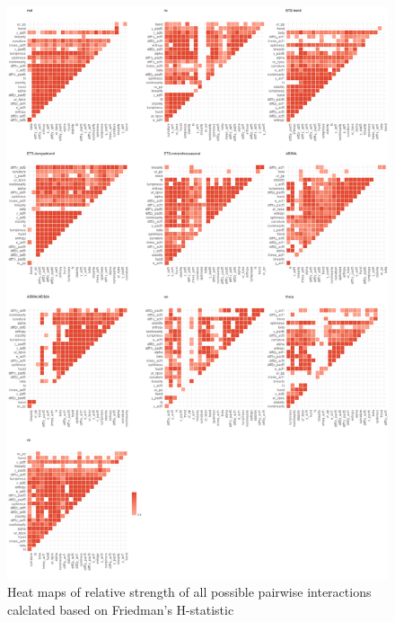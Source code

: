 \documentclass[11pt,a4paper,]{article}
\theoremstyle{definition}
\theoremstyle{definition}
\theoremstyle{definition}
\theoremstyle{remark}
\begin{document}
\begin{figure}
\centering
\includegraphics{figures/friedmany-1.png}
\caption{\label{fig:friedmany}Heat maps of relative strength of all possible
pairwise interactions calclated based on Friedman's H-statistic}
\end{figure}

\newpage
\end{document}

